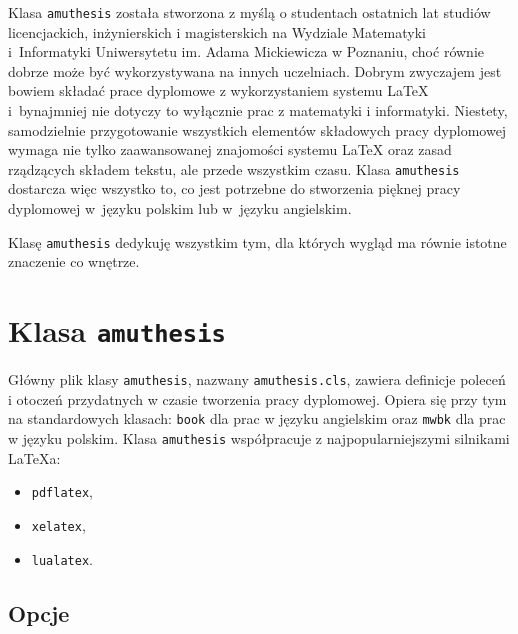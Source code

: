 \documentclass[oneside]{amuthesis}
\author{Bartłomiej Przybylski}
\date{Poznań, wrzesień 2017}
\begin{document}
\maketitle

\begin{streszczenie}
Klasa \texttt{amuthesis} została stworzona z myślą o studentach ostatnich lat studiów licencjackich, inżynierskich i magisterskich na Wydziale Matematyki i~Informatyki Uniwersytetu im. Adama Mickiewicza w Poznaniu, choć równie dobrze może być wykorzystywana na innych uczelniach. Dobrym zwyczajem jest bowiem składać prace dyplomowe z wykorzystaniem systemu \LaTeX{} i~bynajmniej nie dotyczy to wyłącznie prac z matematyki i informatyki. Niestety, samodzielnie przygotowanie wszystkich elementów składowych pracy dyplomowej wymaga nie tylko zaawansowanej znajomości systemu \LaTeX{} oraz zasad rządzących składem tekstu, ale przede wszystkim czasu. Klasa \texttt{amuthesis} dostarcza więc wszystko to, co jest potrzebne do stworzenia pięknej pracy dyplomowej w~języku polskim lub w~języku angielskim.
\end{streszczenie}

\begin{dedykacja}
Klasę \texttt{amuthesis} dedykuję wszystkim tym, dla których wygląd ma równie istotne znaczenie co wnętrze.
\end{dedykacja}

\tableofcontents

\chapter{Klasa \texttt{amuthesis}}

Główny plik klasy \texttt{amuthesis}, nazwany \texttt{amuthesis.cls}, zawiera definicje poleceń i otoczeń przydatnych w czasie tworzenia pracy dyplomowej. Opiera się przy tym na standardowych klasach: \texttt{book} dla prac w języku angielskim oraz \texttt{mwbk} dla prac w języku polskim. Klasa \texttt{amuthesis} współpracuje z najpopularniejszymi silnikami \LaTeX{}a:
\begin{itemize}
  \item \texttt{pdflatex},
  \item \texttt{xelatex},
  \item \texttt{lualatex}.
\end{itemize}

\section{Opcje}
\end{document}
